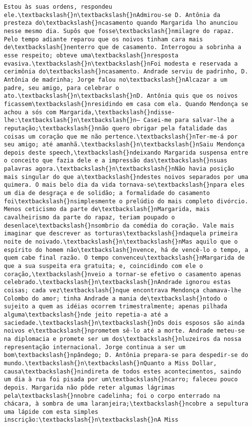 \documentclass[11pt]{article}
\begin{document}
\begin{Verbatim}[commandchars=\\\{\}]
Estou às suas ordens, respondeu ele.\textbackslash{}n\textbackslash{}nAdmirou-se D. Antônia da presteza do\textbackslash{}ncasamento quando Margarida lho anunciou nesse mesmo dia. Supôs que fosse\textbackslash{}nmilagre do rapaz. Pelo tempo adiante reparou que os noivos tinham cara mais de\textbackslash{}nenterro que de casamento. Interrogou a sobrinha a esse respeito; obteve uma\textbackslash{}nresposta evasiva.\textbackslash{}n\textbackslash{}nFoi modesta e reservada a cerimônia do\textbackslash{}ncasamento. Andrade serviu de padrinho, D. Antônia de madrinha; Jorge falou no\textbackslash{}nAlcazar a um padre, seu amigo, para celebrar o ato.\textbackslash{}n\textbackslash{}nD. Antônia quis que os noivos ficassem\textbackslash{}nresidindo em casa com ela. Quando Mendonça se achou a sós com Margarida,\textbackslash{}ndisse-lhe:\textbackslash{}n\textbackslash{}n— Casei-me para salvar-lhe a reputação;\textbackslash{}nnão quero obrigar pela fatalidade das coisas um coração que me não pertence.\textbackslash{}nTer-me-á por seu amigo; até amanhã.\textbackslash{}n\textbackslash{}nSaiu Mendonça depois deste speech,\textbackslash{}ndeixando Margarida suspensa entre o conceito que fazia dele e a impressão das\textbackslash{}nsuas palavras agora.\textbackslash{}n\textbackslash{}nNão havia posição mais singular do que a\textbackslash{}ndestes noivos separados por uma quimera. O mais belo dia da vida tornava-se\textbackslash{}npara eles um dia de desgraça e de solidão; a formalidade do casamento foi\textbackslash{}nsimplesmente o prelúdio do mais completo divórcio. Menos ceticismo da parte de\textbackslash{}nMargarida, mais cavalheirismo da parte do rapaz, teriam poupado o desenlace\textbackslash{}nsombrio da comédia do coração. Vale mais imaginar que descrever as torturas\textbackslash{}ndaquela primeira noite de noivado.\textbackslash{}n\textbackslash{}nMas aquilo que o espírito do homem não\textbackslash{}nvence, há de vencê-lo o tempo, a quem cabe final razão. O tempo convenceu\textbackslash{}nMargarida de que a sua suspeita era gratuita; e, coincidindo com ele o coração,\textbackslash{}nveio a tornar-se efetivo o casamento apenas celebrado.\textbackslash{}n\textbackslash{}nAndrade ignorou estas coisas; cada vez\textbackslash{}nque encontrava Mendonça chamava-lhe Colombo do amor; tinha Andrade a mania de\textbackslash{}ntodo o sujeito a quem as idéias ocorrem trimestralmente; apenas pilhada alguma\textbackslash{}nde jeito repetia-a até a saciedade.\textbackslash{}n\textbackslash{}nOs dois esposos são ainda noivos e\textbackslash{}nprometem sê-lo até a morte. Andrade meteu-se na diplomacia e promete ser um dos\textbackslash{}nluzeiros da nossa representação internacional. Jorge continua a ser um bom\textbackslash{}npândego; D. Antônia prepara-se para despedir-se do mundo.\textbackslash{}n\textbackslash{}nQuanto a Miss Dollar, causa\textbackslash{}nindireta de todos estes acontecimentos, saindo um dia à rua foi pisada por um\textbackslash{}ncarro; faleceu pouco depois. Margarida não pôde reter algumas lágrimas pela\textbackslash{}nnobre cadelinha; foi o corpo enterrado na chácara, à sombra de uma laranjeira;\textbackslash{}ncobre a sepultura uma lápide com esta simples inscrição:\textbackslash{}n\textbackslash{}nA Miss 
\end{Verbatim}
\end{document}
